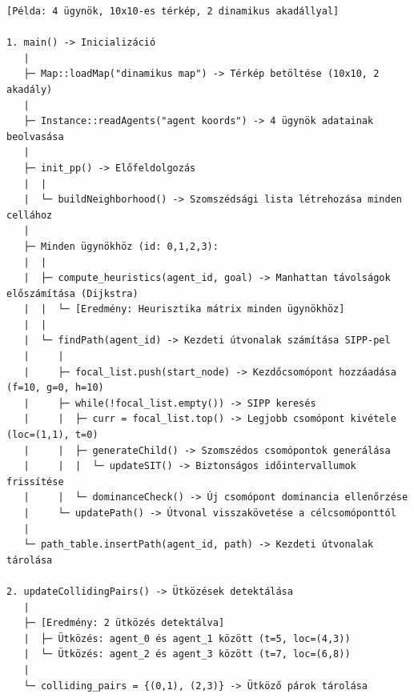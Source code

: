 \documentclass[a4paper,12pt]{article}
\begin{document}
\begin{verbatim}
[Példa: 4 ügynök, 10x10-es térkép, 2 dinamikus akadállyal]

1. main() -> Inicializáció
   |
   ├─ Map::loadMap("dinamikus map") -> Térkép betöltése (10x10, 2 akadály)
   |
   ├─ Instance::readAgents("agent koords") -> 4 ügynök adatainak beolvasása
   |  
   ├─ init_pp() -> Előfeldolgozás
   |  |
   |  └─ buildNeighborhood() -> Szomszédsági lista létrehozása minden cellához
   |
   ├─ Minden ügynökhöz (id: 0,1,2,3):
   |  |
   |  ├─ compute_heuristics(agent_id, goal) -> Manhattan távolságok előszámítása (Dijkstra) 
   |  |  └─ [Eredmény: Heurisztika mátrix minden ügynökhöz]
   |  |
   |  └─ findPath(agent_id) -> Kezdeti útvonalak számítása SIPP-pel
   |     |
   |     ├─ focal_list.push(start_node) -> Kezdőcsomópont hozzáadása (f=10, g=0, h=10)
   |     ├─ while(!focal_list.empty()) -> SIPP keresés
   |     |  ├─ curr = focal_list.top() -> Legjobb csomópont kivétele (loc=(1,1), t=0)
   |     |  ├─ generateChild() -> Szomszédos csomópontok generálása
   |     |  |  └─ updateSIT() -> Biztonságos időintervallumok frissítése
   |     |  └─ dominanceCheck() -> Új csomópont dominancia ellenőrzése
   |     └─ updatePath() -> Útvonal visszakövetése a célcsomóponttól
   |
   └─ path_table.insertPath(agent_id, path) -> Kezdeti útvonalak tárolása

2. updateCollidingPairs() -> Ütközések detektálása
   |
   ├─ [Eredmény: 2 ütközés detektálva]
   |  ├─ Ütközés: agent_0 és agent_1 között (t=5, loc=(4,3))
   |  └─ Ütközés: agent_2 és agent_3 között (t=7, loc=(6,8))
   |
   └─ colliding_pairs = {(0,1), (2,3)} -> Ütköző párok tárolása


\end{verbatim}
\end{document}
